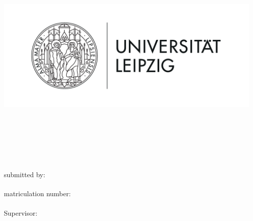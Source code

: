 \thispagestyle{plain}
\begin{titlepage}

    \begin{center}
        \includegraphics[height=7cm]{Bilder/Uni-L.png}\\[2.5ex]

        \institut\\
        \fakultaet\\
        \fachgebiet\\[6ex]

        \textbf{\large\titel}\\[1.5ex]
        \art\\[6ex]

        \normalsize
        submitted by:\\
        \autor\\[1.5ex]
        matriculation number:\\
        \matrikelnr\\[1.5ex]
        Supervisor:\\
        \erstbetreuer\\
    \end{center}



\end{titlepage}
